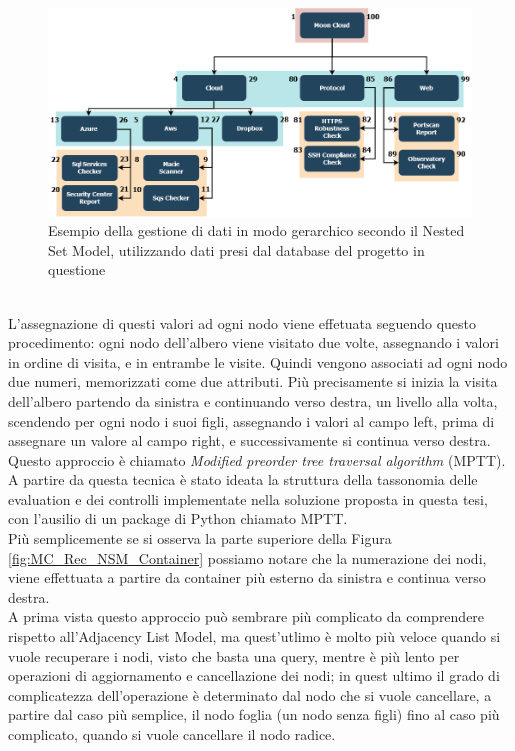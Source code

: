 \begin{figure}[ht!]
	\includegraphics[scale=0.40]{images/MC_Rec_NSM_Tree.png}
	\caption{Esempio della gestione di dati in modo gerarchico secondo il Nested Set Model, utilizzando dati presi dal database del 
	progetto in questione}
	\label{fig:MC_Rec_NSM_Tree}
\end{figure}
\ \\
L'assegnazione di questi valori ad ogni nodo viene effetuata seguendo questo procedimento: ogni nodo dell'albero viene visitato due volte, 
assegnando i valori in ordine di visita, e in entrambe le visite. Quindi vengono associati ad ogni nodo due numeri, memorizzati come 
due attributi. 
Più precisamente si inizia la visita dell'albero partendo da sinistra e continuando verso destra, un livello alla volta, scendendo per ogni
nodo i suoi figli, assegnando i valori al campo left, prima di assegnare un valore al campo right, e successivamente si continua verso 
destra. Questo approccio è chiamato \textit{Modified preorder tree traversal algorithm} (MPTT). A partire da questa tecnica è stato 
ideata la struttura della tassonomia delle evaluation e dei controlli implementate nella soluzione proposta in questa tesi, con 
l'ausilio di un package di Python chiamato MPTT.\\
Più semplicemente se si osserva la parte superiore della Figura \ref{fig:MC_Rec_NSM_Container} possiamo notare che la numerazione dei nodi, viene
effettuata a partire da container più esterno da sinistra e continua verso destra.\\
A prima vista questo approccio può sembrare più complicato da comprendere rispetto all'Adjacency List Model, ma quest'utlimo è
molto più veloce quando si vuole recuperare i nodi, visto che basta una query, mentre è più lento per operazioni di aggiornamento e 
cancellazione dei nodi; in quest ultimo il grado di complicatezza dell'operazione è determinato dal nodo che si vuole cancellare, a 
partire dal caso più semplice, il nodo foglia (un nodo senza figli) fino al caso più complicato, quando si vuole cancellare il nodo 
radice.

